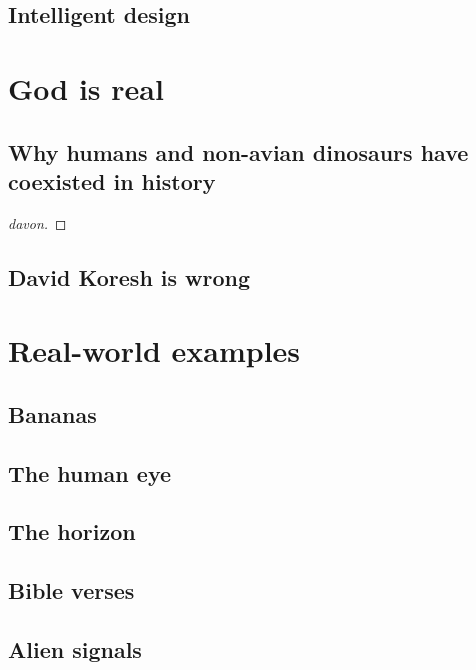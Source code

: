 \documentclass[babel=english]{inetthesis}
\begin{document}
\lipsum

\section{Intelligent design}

\lipsum

\chapter{God is real}

\lipsum[2]

\section{Why humans and non-avian dinosaurs have coexisted in history}

\lipsum[1]

\begin{theorem}
  \lipsum[1]
\end{theorem}

\begin{proof}[davon]
  \lipsum[2]
\end{proof}

\lipsum[2]

\section{David Koresh is wrong}

\lipsum

\chapter{Real-world examples}

\lipsum[2]

\section{Bananas}

\lipsum

\section{The human eye}

\lipsum

\section{The horizon}

\lipsum

\appendix

\section{Bible verses}

\lipsum

\section{Alien signals}

\lipsum
\end{document}
